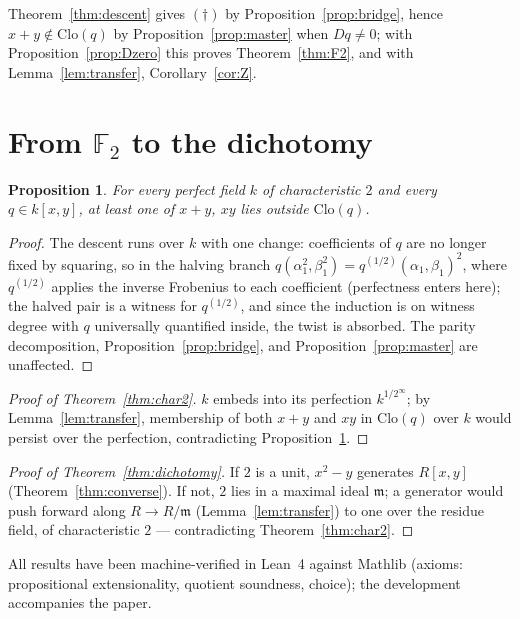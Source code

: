 \documentclass[11pt]{article}
\newtheorem{proposition}[theorem]{Proposition}
\theoremstyle{definition}
\newcommand{\F}{\mathbb{F}}
\newcommand{\Clo}{\mathrm{Clo}}
\begin{document}
Theorem~\ref{thm:descent} gives $(\dagger)$ by
Proposition~\ref{prop:bridge}, hence $x+y \notin \Clo(q)$ by
Proposition~\ref{prop:master} when $Dq \neq 0$; with
Proposition~\ref{prop:Dzero} this proves Theorem~\ref{thm:F2}, and
with Lemma~\ref{lem:transfer}, Corollary~\ref{cor:Z}.

\section{From $\F_2$ to the dichotomy}\label{sec:tothedichotomy}

\begin{proposition}\label{prop:perfect}
For every perfect field $k$ of characteristic $2$ and every
$q \in k[x,y]$, at least one of $x+y$, $xy$ lies outside $\Clo(q)$.
\end{proposition}

\begin{proof}
The descent runs over $k$ with one change: coefficients of $q$ are no
longer fixed by squaring, so in the halving branch
$q(\alpha_1^2, \beta_1^2) = q^{(1/2)}(\alpha_1, \beta_1)^2$, where
$q^{(1/2)}$ applies the inverse Frobenius to each coefficient
(perfectness enters here); the halved pair is a witness for
$q^{(1/2)}$, and since the induction is on witness degree with $q$
universally quantified inside, the twist is absorbed.  The parity
decomposition, Proposition~\ref{prop:bridge}, and
Proposition~\ref{prop:master} are unaffected.
\end{proof}

\begin{proof}[Proof of Theorem~\ref{thm:char2}]
$k$ embeds into its perfection $k^{1/2^\infty}$; by
Lemma~\ref{lem:transfer}, membership of both $x+y$ and $xy$ in
$\Clo(q)$ over $k$ would persist over the perfection, contradicting
Proposition~\ref{prop:perfect}.
\end{proof}

\begin{proof}[Proof of Theorem~\ref{thm:dichotomy}]
If $2$ is a unit, $x^2 - y$ generates $R[x,y]$
(Theorem~\ref{thm:converse}).  If not, $2$ lies in a maximal ideal
$\mathfrak m$; a generator would push forward along
$R \to R/\mathfrak m$ (Lemma~\ref{lem:transfer}) to one over the
residue field, of characteristic $2$ --- contradicting
Theorem~\ref{thm:char2}.
\end{proof}

\medskip

All results have been machine-verified in Lean~4 against Mathlib
(axioms: propositional extensionality, quotient soundness, choice);
the development accompanies the paper.
\end{document}
